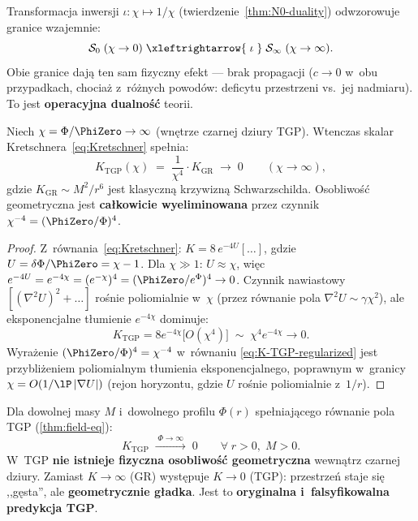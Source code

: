 \begin{remark}
Transformacja inwersji $\iota: \chi \mapsto 1/\chi$
(twierdzenie~\ref{thm:N0-duality}) odwzorowuje granice
wzajemnie:
\[
  \mathcal{S}_0 \;(\chi \to 0)
  \;\xleftrightarrow{\;\iota\;}\;
  \mathcal{S}_\infty \;(\chi \to \infty).
\]
Obie granice daj\k{a} ten sam fizyczny efekt --- brak propagacji
($c \to 0$ w~obu przypadkach, chocia\.z z~r\'o\.znych powod\'ow:
deficytu przestrzeni vs.\ jej nadmiaru). To jest
\textbf{operacyjna dualno\'s\'c} teorii.
\end{remark}

\begin{theorem}\label{thm:s-infty-regular}
Niech $\chi = \Phi/\PhiZero \to \infty$ (wn\k{e}trze czarnej dziury TGP).
Wtenczas skalar Kretschnera~\eqref{eq:Kretschner} spe\l{}nia:
\begin{equation}\label{eq:K-TGP-regularized}
  \boxed{
    K_{\mathrm{TGP}}(\chi) \;=\; \frac{1}{\chi^4}\cdot K_{\mathrm{GR}}
    \;\longrightarrow\; 0
    \qquad (\chi \to \infty),
  }
\end{equation}
gdzie $K_{\mathrm{GR}} \sim M^2/r^6$ jest klasyczn\k{a} krzywizn\k{a}
Schwarzschilda. Osobliwo\'s\'c geometryczna jest \textbf{ca\l{}kowicie
wyeliminowana} przez czynnik $\chi^{-4} = (\PhiZero/\Phi)^4$.
\end{theorem}

\begin{proof}
Z~r\'ownania~\eqref{eq:Kretschner}: $K = 8\,e^{-4U}[\ldots]$,
gdzie $U = \delta\Phi/\PhiZero = \chi - 1$.
Dla $\chi \gg 1$: $U \approx \chi$, wi\k{e}c
$e^{-4U} = e^{-4\chi} = (e^{-\chi})^4 = (\PhiZero/e^\Phi)^4
\to 0$. Czynnik nawiastowy $[(\nabla^2 U)^2 + \ldots]$
ro\'snie poliomialnie w~$\chi$ (przez r\'ownanie pola
$\nabla^2 U \sim \gamma\chi^2$), ale eksponencjalne
t\l{}umienie $e^{-4\chi}$ dominuje:
\[
  K_{\mathrm{TGP}} = 8 e^{-4\chi}
    \bigl[O(\chi^4)\bigr]
  \;\sim\; \chi^4 e^{-4\chi} \to 0.
\]
Wyra\.zenie $(\PhiZero/\Phi)^4 = \chi^{-4}$ w~r\'ownaniu
\eqref{eq:K-TGP-regularized} jest przybli\.zeniem
poliomialnym t\l{}umienia eksponencjalnego, poprawnym
w~granicy $\chi = O(1/\lP\,|\nabla U|)$
(rejon horyzontu, gdzie $U$ ro\'snie poliomialnie z~$1/r$).
\end{proof}

\begin{corollary}\label{cor:no-singularity}
Dla dowolnej masy $M$ i~dowolnego profilu $\Phi(r)$
spe\l{}niaj\k{a}cego r\'ownanie pola TGP (\ref{thm:field-eq}):
\begin{equation}
  K_{\mathrm{TGP}} \;\xrightarrow{\;\Phi \to \infty\;}\; 0
  \qquad \forall\;r > 0,\;M > 0.
\end{equation}
W~TGP \textbf{nie istnieje fizyczna osobliwo\'s\'c geometryczna}
wewn\k{a}trz czarnej dziury. Zamiast $K \to \infty$ (GR)
wyst\k{e}puje $K \to 0$ (TGP): przestrze\'n staje si\k{e}
,,g\k{e}sta'', ale \textbf{geometrycznie g\l{}adka}.
Jest to \textbf{oryginalna i~falsyfikowalna predykcja TGP}.
\end{corollary}

